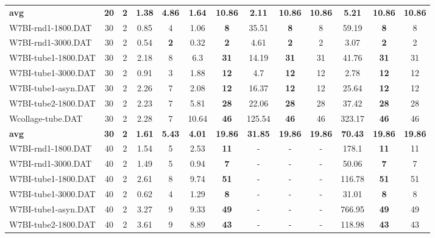 \begin{table}[h]
{\begin{tabular}{lcccccccccccc}
\cline{1-13} \textbf{avg} & \textbf{20} & \textbf{2} & \textbf{1.38} & \textbf{4.86} & \textbf{1.64} & \textbf{10.86} & \textbf{2.11} & \textbf{10.86} & \textbf{10.86} & \textbf{5.21} & \textbf{10.86} & \textbf{10.86} \\ \cline{1-13}
W7BI-rnd1-1800.DAT & 30 & 2 &  \textcolor{blue2}{0.85} & 4 & 1.06 &  \textbf{8} & 35.51 &  \textbf{8} & 8 & 59.19 &  \textbf{8} & 8 \\
W7BI-rnd1-3000.DAT & 30 & 2 & 0.54 &  \textbf{2} &  \textcolor{blue2}{0.32} &  \textbf{2} & 4.61 &  \textbf{2} & 2 & 3.07 &  \textbf{2} & 2 \\
W7BI-tube1-1800.DAT & 30 & 2 &  \textcolor{blue2}{2.18} & 8 & 6.3 &  \textbf{31} & 14.19 &  \textbf{31} & 31 & 41.76 &  \textbf{31} & 31 \\
W7BI-tube1-3000.DAT & 30 & 2 &  \textcolor{blue2}{0.91} & 3 & 1.88 &  \textbf{12} & 4.7 &  \textbf{12} & 12 & 2.78 &  \textbf{12} & 12 \\
W7BI-tube1-asyn.DAT & 30 & 2 & 2.26 & 7 &  \textcolor{blue2}{2.08} &  \textbf{12} & 16.37 &  \textbf{12} & 12 & 25.64 &  \textbf{12} & 12 \\
W7BI-tube2-1800.DAT & 30 & 2 &  \textcolor{blue2}{2.23} & 7 & 5.81 &  \textbf{28} & 22.06 &  \textbf{28} & 28 & 37.42 &  \textbf{28} & 28 \\
Wcollage-tube.DAT & 30 & 2 &  \textcolor{blue2}{2.28} & 7 & 10.64 &  \textbf{46} & 125.54 &  \textbf{46} & 46 & 323.17 &  \textbf{46} & 46 \\
\cline{1-13} \textbf{avg} & \textbf{30} & \textbf{2} & \textbf{1.61} & \textbf{5.43} & \textbf{4.01} & \textbf{19.86} & \textbf{31.85} & \textbf{19.86} & \textbf{19.86} & \textbf{70.43} & \textbf{19.86} & \textbf{19.86} \\ \cline{1-13}
W7BI-rnd1-1800.DAT & 40 & 2 & 1.54 & 5 & 2.53 &  \textbf{11} &  - &  - &  - & 178.1 &  \textbf{11} & 11 \\
W7BI-rnd1-3000.DAT & 40 & 2 & 1.49 & 5 & 0.94 &  \textbf{7} &  - &  - &  - & 50.06 &  \textbf{7} & 7 \\
W7BI-tube1-1800.DAT & 40 & 2 & 2.61 & 8 & 9.74 &  \textbf{51} &  - &  - &  - & 116.78 &  \textbf{51} & 51 \\
W7BI-tube1-3000.DAT & 40 & 2 & 0.62 & 4 & 1.29 &  \textbf{8} &  - &  - &  - & 31.01 &  \textbf{8} & 8 \\
W7BI-tube1-asyn.DAT & 40 & 2 & 3.27 & 9 & 9.33 &  \textbf{49} &  - &  - &  - & 766.95 &  \textbf{49} & 49 \\
W7BI-tube2-1800.DAT & 40 & 2 & 3.61 & 9 & 8.89 &  \textbf{43} &  - &  - &  - & 118.98 &  \textbf{43} & 43 \\

\end{tabular}}
\end{table}

